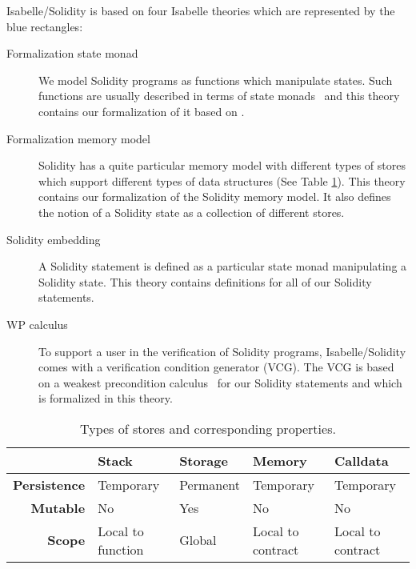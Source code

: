 \documentclass[a4paper,UKenglish,cleveref, autoref, thm-restate]{oasics-v2021}
\begin{document}
Isabelle/Solidity is based on four Isabelle theories which are represented by the {\color{blue}blue rectangles}:
\begin{description}
    \item[Formalization state monad]
    We model Solidity programs as functions which manipulate states.
    Such functions are usually described in terms of state monads~\cite{Wadler1993} and this theory contains our formalization of it based on \cite{Cock2008}.
    \item[Formalization memory model]
    Solidity has a quite particular memory model with different types of stores which support different types of data structures (See Table \ref{tab:stores}).
    This theory contains our formalization of the Solidity memory model.
    It also defines the notion of a Solidity state as a collection of different stores.
    \item[Solidity embedding]
    A Solidity statement is defined as a particular state monad manipulating a Solidity state.
    This theory contains definitions for all of our Solidity statements.
    \item[WP calculus]
    To support a user in the verification of Solidity programs, Isabelle/Solidity comes with a verification condition generator (VCG).
    The VCG is based on a weakest precondition calculus~\cite{Dijkstra1975} for our Solidity statements and which is formalized in this theory.
\end{description}
\begin{table}[b]\footnotesize
	\centering
	\caption{Types of stores and corresponding properties.}\label{tab:stores}
	\small\vspace{-0.2cm}
  \begin{tabular}{rllll}
		\toprule
		&\textbf{Stack}&\textbf{Storage}&\textbf{Memory}&\textbf{Calldata}\\
		\midrule
		\textbf{Persistence}&Temporary&Permanent&Temporary&Temporary\\
		\textbf{Mutable}&No&Yes&No&No\\
		\textbf{Scope}&Local to function&Global&Local to contract& Local to contract\\
		\bottomrule
	\end{tabular}
	\vspace{-0.5cm}
\end{table}
\end{document}
